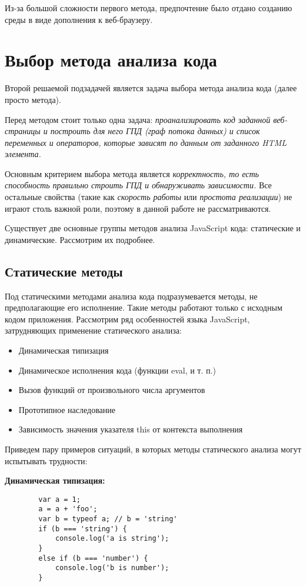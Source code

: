 	Из-за большой сложности первого метода, предпочтение было отдано созданию среды в виде дополнения к веб-браузеру.

\section{Выбор метода анализа кода}

Второй решаемой подзадачей является задача выбора метода анализа кода (далее просто метода). 

\bigskip
Перед методом стоит только одна задача: \textit{проанализировать код заданной веб-страницы и построить для него ГПД (граф потока данных) и список переменных и операторов, которые зависят по данным от заданного HTML элемента.}

\bigskip
Основным критерием выбора метода является \textit{корректность, то есть способность правильно строить ГПД и обнаруживать зависимости.} Все остальные свойства (такие как \textit{скорость работы} или \textit{простота реализации}) не играют столь важной роли, поэтому в данной работе не рассматриваются.

\bigskip
Существует две основные группы методов анализа JavaScript кода: статические и динамические. Рассмотрим их подробнее.

\subsection{Статические методы}
	Под статическими методами анализа кода подразумевается методы, не предполагающие его исполнение. Такие методы работают только с исходным кодом приложения. Рассмотрим ряд особенностей языка JavaScript, затрудняющих применение статического анализа:

	\begin{itemize}
		\item Динамическая типизация
		\item Динамическое исполнения кода (функции eval, и т. п.)
		\item Вызов функций от произвольного числа аргументов
		\item Прототипное наследование
		\item Зависимость значения указателя this от контекста выполнения
	\end{itemize}
	\bigskip

	Приведем пару примеров ситуаций, в которых методы статического анализа могут испытывать трудности:


	\bigskip
	\textbf{Динамическая типизация:}
	\begin{lstlisting}
		var a = 1;
		a = a + 'foo';
		var b = typeof a; // b = 'string'
		if (b === 'string') {
			console.log('a is string');
		}
		else if (b === 'number') {
			console.log('b is number');
		}
	\end{lstlisting}

